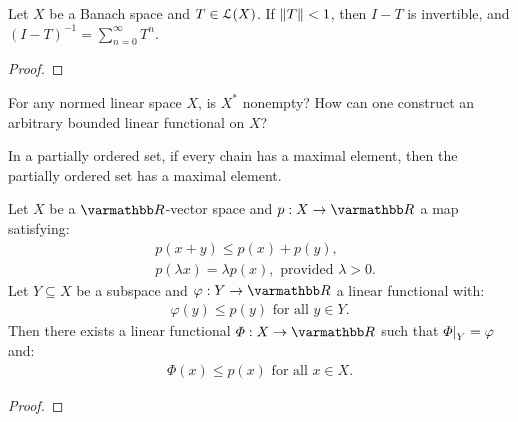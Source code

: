 \begin{corollary}
    Let $X$ be a Banach space and $T \in \mathcal{L}(X)$. If $\left\lVert T \right\rVert < 1$, then $I - T$ is invertible, and $(I - T)^{-1} = \sum_{n = 0}^\infty T^n$.
\end{corollary}
    {\color{red} \begin{proof}
        
    \end{proof}}

\begin{question}
For any normed linear space $X$, is $X^\ast$ nonempty? How can one construct an arbitrary bounded linear functional on $X$?
\end{question}

\begin{lemma}\label{lemma:zorns}
    In a partially ordered set, if every chain has a maximal element, then the partially ordered set has a maximal element.
\end{lemma}

\begin{theorem}\label{thm:hahn-banach}
Let $X$ be a $\bfR$-vector space and $p:X \rightarrow \bfR$ a map satisfying:
    \begin{equation*}
    \begin{split}
        &p(x+y) \leq p(x) + p(y), \\
        &p(\lambda x) = \lambda p(x), \text{ provided  }\lambda >0.
    \end{split}
    \end{equation*}
Let $Y \subseteq X$ be a subspace and $\varphi:Y \rightarrow \bfR$ a linear functional with:
    \begin{equation*}
    \begin{split}
        \varphi(y) \leq p(y) \text{ for all }y \in Y.
    \end{split}
    \end{equation*}
Then there exists a linear functional $\varPhi:X \rightarrow \bfR$ such that $\restr{\varPhi}{Y} = \varphi$ and:
    \begin{equation*}
    \begin{split}
        \varPhi(x) \leq p(x) \text{ for all }x \in X.
    \end{split}
    \end{equation*}
\end{theorem}
    {\color{red} \begin{proof}
        
    \end{proof}}

